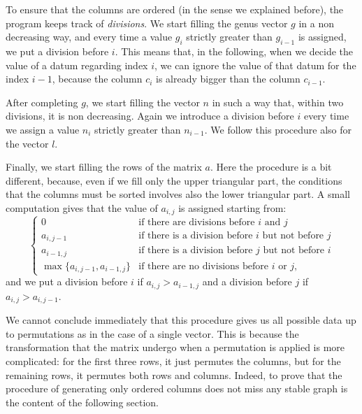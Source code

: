 \documentclass{amsart}
\theoremstyle{plain}
\theoremstyle{definition}
\begin{document}
To ensure that the columns are ordered (in the sense we explained
before), the program keeps track of \emph{divisions}. We start filling
the genus vector $g$ in a non decreasing way, and every time a value
$g_i$ strictly greater than $g_{i-1}$ is assigned, we put a division
before $i$.
This means that, in the following, when we decide the
value of a datum regarding index $i$, we can ignore the value of that
datum for the index $i-1$, because the column $c_i$ is already bigger
than the column $c_{i-1}$.

After completing $g$, we start filling the vector $n$ in such a way
that, within two divisions, it is non decreasing. Again we introduce a
division before $i$ every time we assign a value $n_i$ strictly
greater than $n_{i-1}$. We follow this procedure also for the vector
$l$.

Finally, we start filling the rows of the matrix $a$. Here the
procedure is a bit different, because, even if we fill only the upper
triangular part, the conditions that the columns must be sorted
involves also the lower triangular part. A small computation gives
that the value of $a_{i,j}$ is assigned starting from:
\[
\begin{cases}
  0 & \text{if there are divisions before $i$ and $j$}\\
  a_{i,j-1} & \text{if there is a division before $i$ but not before
    $j$}\\
  a_{i-1,j} & \text{if there is a division before $j$ but not before
    $i$}\\
  \max\{a_{i,j-1}, a_{i-1,j}\} & \text{if there are no divisions
    before $i$ or $j$,}
\end{cases}
\]
and we put a division before $i$ if $a_{i,j} > a_{i-1,j}$ and a division
before $j$ if $a_{i,j} > a_{i,j-1}$.

We cannot conclude immediately that this procedure gives us all
possible data up to permutations as in the case of a single
vector. This is because the transformation that the matrix undergo
when a permutation is applied is more complicated: for the first three
rows, it just permutes the columns, but for the remaining rows, it
permutes both rows and columns. Indeed, to prove that the procedure of
generating only ordered columns does not miss any stable graph is the
content of the following section.
\end{document}
